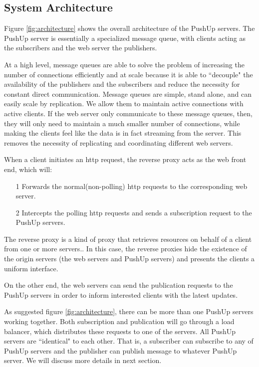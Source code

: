 \subsection{System Architecture\\}

Figure \ref{fig:architecture} shows the overall architecture of the PushUp servers.
The PushUp server is essentially a specialized message queue, with clients 
acting as the subscribers and the web server the publishers.

At a high level, message queues are able to solve the problem of increasing the number of
connections efficiently and at scale because it is able to ``decouple" the availability of
the publishers and the subscribers and reduce the necessity for constant direct communication. 
Message queues are simple, stand alone, and can easily scale by replication. 
We allow them to maintain active connections with active clients. If the web server 
only communicate to these message queues, then, they will only need to maintain a much 
smaller number of connections, while making the clients feel like the data is in fact 
streaming from the server. This removes the necessity of replicating and coordinating different 
web servers.

When a client initiates an http request, the reverse proxy acts as the web front end,
which will:
\begin{itemize}
    \item[1] Forwards the normal(non-polling) http requests to the corresponding 
             web server.
    \item[2] Intercepts the polling http requests and sends a subscription request to 
             the PushUp servers.
\end{itemize}


The reverse proxy is a kind of proxy that retrieves
resources on behalf of a client from one or more 
servers.\cite{ReverseProxy}. In this case, the reverse
proxies hide the existence of the origin servers (the 
web servers and PushUp servers) and presents the clients
a uniform interface.

On the other end, the web servers can send the publication requests to the 
PushUp servers in order to inform interested clients with the latest updates.

As suggested figure \ref{fig:architecture}, there can be more than one PushUp 
servers working together. Both subscription and publication will go through a 
load balancer, which distributes these requests to one of the servers. All 
PushUp servers are ``identical" to each other. That is, a subscriber can 
subscribe to any of PushUp servers and the publisher can 
publish message to whatever PushUp server. We will discuss more details in next
section.


